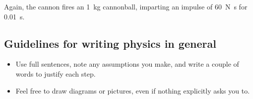\documentclass[answers]{exam}
\begin{document}
\begin{questions}
            Again, the cannon fires an \SI{1}{\kilo\gram} cannonball, imparting an impulse of \SI{60}{\newton\second}
            for \SI{0.01}{\second}.
\end{questions}

\subsection*{Guidelines for writing physics in general}
\begin{itemize}
  \item Use full sentences, note any assumptions you make, and write a couple of words to justify each step.
  \item Feel free to draw diagrams or pictures, even if nothing explicitly asks you to.
\end{itemize}
\end{document}
